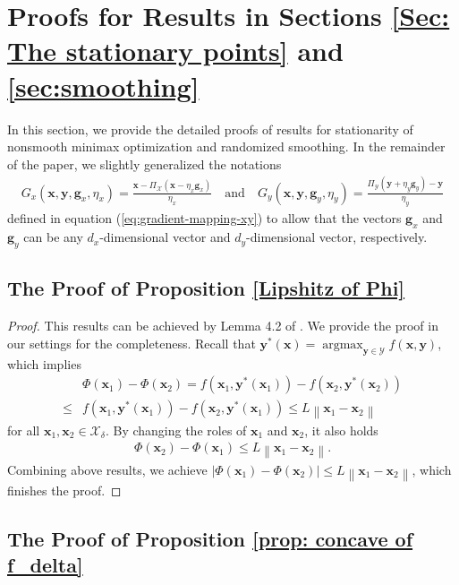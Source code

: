 \documentclass[11pt]{article}
\def\vg{\mathbf{g}}
\def\vx{\mathbf{x}}
\def\vy{\mathbf{y}}
\def\fX{{\mathcal{X}}}
\def\fY{{\mathcal{Y}}}
\newcommand{\norm}[1]{\left\| #1 \right\|}
\DeclareMathOperator*{\argmax}{argmax}
\begin{document}
\def\AUC{{\rm{AUC}}}
\def\SVI{{\rm{SVI}}}
\def\VI{{\rm{VI}}}
\def\ApproxMax{{\rm{ApproxMax}}}




\section{Proofs for Results in Sections \ref{Sec: The stationary points} and \ref{sec:smoothing}}\label{appendix:stationary-smoothing}

In this section, we provide the detailed proofs of results for stationarity of nonsmooth minimax optimization and randomized smoothing. 
In the remainder of the paper, we slightly generalized the notations 
\begin{align}\label{eq:general gradient-mapping-xy}
        G_x(\vx, \vy,\vg_{x},\eta_x) = \frac{\vx-\Pi_\mathcal{X}\left(\vx - \eta_x \vg_{x}\right) }{\eta_x}
        \quad\text{and}\quad
        G_y(\vx, \vy,\vg_{y},\eta_y) = \frac{\Pi_\mathcal{Y}\left(\vy + \eta_y \vg_{y}\right) - \vy}{\eta_y}
\end{align}
defined in equation (\ref{eq:gradient-mapping-xy}) to allow that the vectors $\vg_x$ and $\vg_y$ can be any $d_x$-dimensional vector and $d_y$-dimensional vector, respectively.

\subsection{The Proof of Proposition \ref{Lipshitz of Phi}}
\begin{proof}
This results can be achieved by Lemma 4.2 of \citet{lin2025two}.
We provide the proof in our settings for the completeness.
Recall that $\vy^*(\vx)=\argmax_{\vy\in\fY}f(\vx,\vy)$, which implies
\begin{align*}
& \Phi(\vx_1) - \Phi(\vx_2) 
= f(\vx_1, \vy^*(\vx_1)) - f(\vx_2, \vy^*(\vx_2)) \\
\leq & f(\vx_1, \vy^*(\vx_1)) - f(\vx_2, \vy^*(\vx_1)) 
\leq  L\norm{\vx_1 - \vx_2}
\end{align*} 
for all $\vx_1,\vx_2\in\fX_\delta$.
By changing the roles of $\vx_1$ and $\vx_2$, it also holds
\begin{align*}
\Phi(\vx_2) - \Phi(\vx_1) \leq  L\norm{\vx_1 - \vx_2}.
\end{align*}
Combining above results, we achieve
$|\Phi(\vx_1) - \Phi(\vx_2)|\leq L\norm{\vx_1 - \vx_2}$, which finishes the proof.
\end{proof}

\subsection{The Proof of Proposition \ref{prop: concave of f_delta}}
\end{document}
